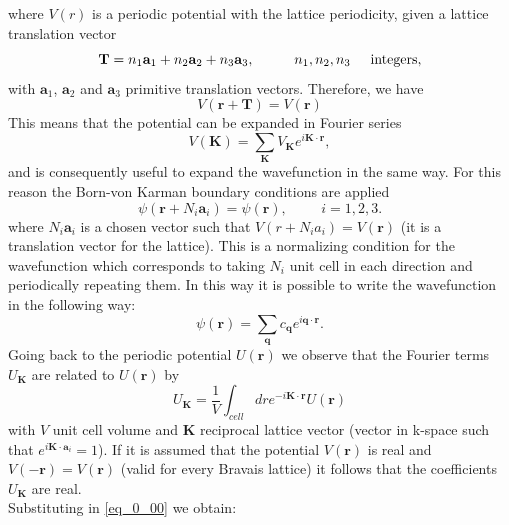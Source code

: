 \documentclass[12pt, a4paper]{report}
\numberwithin{equation}{section}
\begin{document}
where $V(r)$ is a periodic potential with the lattice periodicity, given a lattice translation vector
\begin{equation}
    \mathbf{T}=n_1\mathbf{a}_1+n_2\mathbf{a}_2+n_3\mathbf{a}_3,\hspace{1cm}n_1,n_2,n_3\hspace{0.5cm}\mathrm{integers},
\end{equation}
with $\mathbf{a}_1$, $\mathbf{a}_2$ and $\mathbf{a}_3$ primitive translation vectors.
Therefore, we have
\begin{equation}
    V(\mathbf{r}+\mathbf{T})=V(\mathbf{r})
\end{equation}
This means that the potential can be expanded in Fourier series
\begin{equation}
    V(\mathbf{K})=\sum_\mathbf{K}V_\mathbf{K}e^{i\mathbf{K}\cdot \mathbf{r}},
\end{equation}
and is consequently useful to expand the wavefunction in the same way. For this reason the Born-von Karman boundary conditions
are applied \cite{Ashcroft76}
\begin{equation}
    \psi(\mathbf{r}+N_i\mathbf{a}_i)=\psi(\mathbf{r}),\hspace{1cm}i=1,2,3.
\end{equation}
where $N_i\mathbf{a}_i$ is a chosen vector such that $V(r+N_ia_i)=V(\mathbf{r})$ (it is a translation vector for the lattice). This is a normalizing
condition for the wavefunction which corresponds to taking $N_i$ unit cell in each direction and periodically repeating them. In this 
way it is possible to write the wavefunction in the following way:
\begin{equation}
    \psi(\mathbf{r})=\sum_\mathbf{q}c_\mathbf{q}e^{i\mathbf{q}\cdot\mathbf{r}}.
    \label{eq_0_01}
\end{equation}
Going back to the periodic potential $U(\mathbf{r})$ we observe that the Fourier terms $U_\mathbf{K}$ are related to $U(\mathbf{r})$ by
\begin{equation}
    U_\mathbf{K}=\frac{1}{V}\int_{cell}dre^{-i\mathbf{K}\cdot\mathbf{r}}U(\mathbf{r})
\end{equation}
with $V$ unit cell volume and $\mathbf{K}$ reciprocal lattice vector (vector in k-space such that $e^{i\mathbf{K}\cdot \mathbf{a}_i}=1$). If it is 
assumed that the potential $V(\mathbf{r})$ is real and $V(-\mathbf{r})=V(\mathbf{r})$ (valid for every Bravais lattice) it follows that the coefficients 
$U_\mathbf{K}$ are real.\\
Substituting in \ref{eq_0_00} we obtain:
\end{document}
